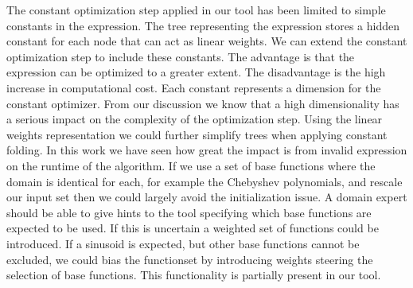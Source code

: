 The constant optimization step applied in our tool has been limited to simple constants in the expression. The tree representing the expression stores a hidden constant for each node that can act as linear weights. We can extend the constant optimization step to include these constants. The advantage is that the expression can be optimized to a greater extent. The disadvantage is the high increase in computational cost. Each constant represents a dimension for the constant optimizer. From our discussion we know that a high dimensionality has a serious impact on the complexity of the optimization step. Using the linear weights representation we could further simplify trees when applying constant folding. In this work we have seen how great the impact is from invalid expression on the runtime of the algorithm. If we use a set of base functions where the domain is identical for each, for example the Chebyshev polynomials, and rescale our input set then we could largely avoid the initialization issue. A domain expert should be able to give hints to the tool specifying which base functions are expected to be used. If this is uncertain a weighted set of functions could be introduced. If a sinusoid is expected, but other base functions cannot be excluded, we could bias the functionset by introducing weights steering the selection of base functions. This functionality is partially present in our tool. 